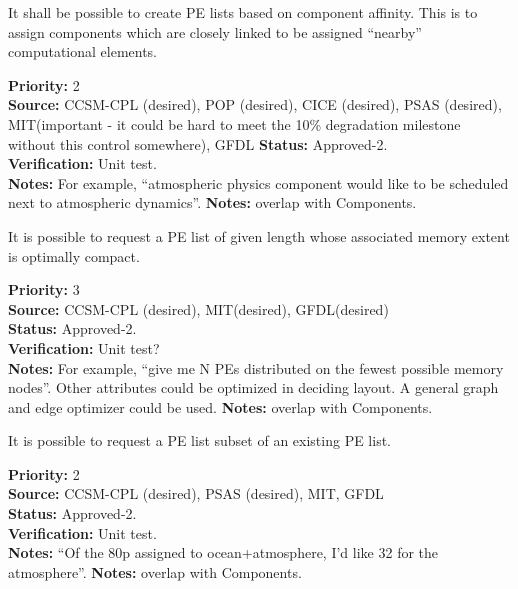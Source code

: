 
It shall be possible to create PE lists based on component affinity. This is
to assign components which are closely linked to be assigned
``nearby'' computational elements.

\begin{reqlist}
{\bf Priority:}  2 \\
{\bf Source:}  CCSM-CPL (desired), POP (desired), CICE (desired), PSAS (desired),
MIT(important - it could be hard to meet the 10\% degradation milestone without
this control somewhere), GFDL
{\bf Status:} Approved-2. \\
{\bf Verification:} Unit test. \\ 
{\bf Notes:}  For example, ``atmospheric physics component would like 
to be scheduled next to atmospheric dynamics''.
{\bf Notes:} overlap with Components.
\end{reqlist}


It is possible to request a PE list of given length whose associated
memory extent is optimally compact.

\begin{reqlist}
{\bf Priority:} 3 \\
{\bf Source:}  CCSM-CPL (desired), MIT(desired), GFDL(desired) \\
{\bf Status:} Approved-2. \\
{\bf Verification:} Unit test?\\ 
{\bf Notes:}  For example, ``give me N PEs distributed on the fewest possible
  memory nodes''. Other attributes could be optimized in deciding layout.
A general graph and edge optimizer could be used.
{\bf Notes:} overlap with Components.
\end{reqlist}


It is possible to request a PE list subset of an existing PE list.

\begin{reqlist}
{\bf Priority:} 2 \\
{\bf Source:}  CCSM-CPL (desired), PSAS (desired), MIT, GFDL \\
{\bf Status:} Approved-2. \\
{\bf Verification:} Unit test.\\ 
{\bf Notes:}  ``Of the 80p assigned to ocean+atmosphere, I'd like 32
  for the atmosphere''.
{\bf Notes:} overlap with Components.
\end{reqlist}

